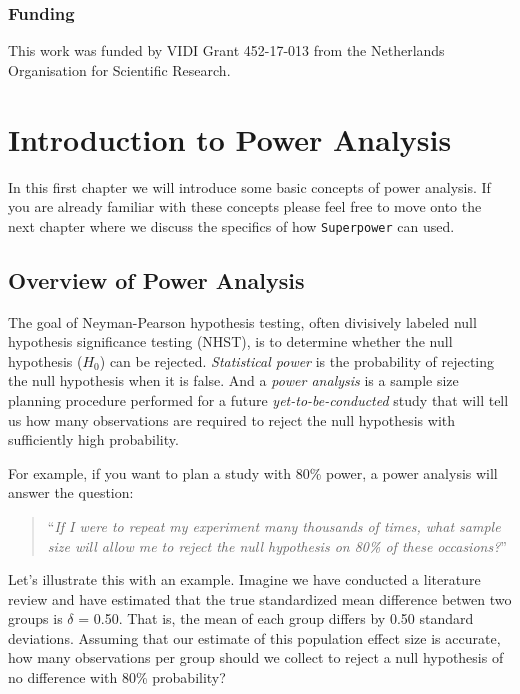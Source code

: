 \documentclass[
]{book}
\begin{document}
\hypertarget{funding}{%
\subsection*{Funding}\label{funding}}

This work was funded by VIDI Grant 452-17-013 from the Netherlands Organisation for Scientific Research.

\hypertarget{introduction-to-power-analysis}{%
\chapter{Introduction to Power Analysis}\label{introduction-to-power-analysis}}

In this first chapter we will introduce some basic concepts of power analysis. If you are already familiar with these concepts please feel free to move onto the next chapter where we discuss the specifics of how \texttt{Superpower} can used.

\hypertarget{overview-of-power-analysis}{%
\section{Overview of Power Analysis}\label{overview-of-power-analysis}}

The goal of Neyman-Pearson hypothesis testing, often divisively labeled null hypothesis significance testing (NHST), is to determine whether the null hypothesis (\(H_0\)) can be rejected. \emph{Statistical power} is the probability of rejecting the null hypothesis when it is false. And a \emph{power analysis} is a sample size planning procedure performed for a future \emph{yet-to-be-conducted} study that will tell us how many observations are required to reject the null hypothesis with sufficiently high probability.

For example, if you want to plan a study with 80\% power, a power analysis will answer the question:

\begin{quote}
``\emph{If I were to repeat my experiment many thousands of times, what sample size will allow me to reject the null hypothesis on 80\% of these occasions?}''
\end{quote}

Let's illustrate this with an example. Imagine we have conducted a literature review and have estimated that the true standardized mean difference betwen two groups is \(\delta\) = 0.50. That is, the mean of each group differs by 0.50 standard deviations. Assuming that our estimate of this population effect size is accurate, how many observations per group should we collect to reject a null hypothesis of no difference with 80\% probability?
\end{document}
